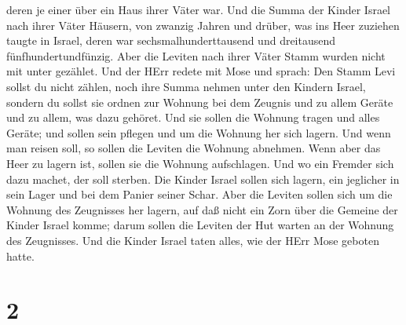 deren je einer über ein Haus ihrer Väter war.  Und die
Summa der Kinder Israel nach ihrer Väter Häusern, von zwanzig Jahren und
drüber, was ins Heer zuziehen taugte in Israel,  deren war
sechsmalhunderttausend und dreitausend fünfhundertundfünzig.
 Aber die Leviten nach ihrer Väter Stamm wurden nicht mit
unter gezählet.  Und der HErr redete mit Mose und sprach:
 Den Stamm Levi sollst du nicht zählen, noch ihre Summa
nehmen unter den Kindern Israel,  sondern du sollst sie
ordnen zur Wohnung bei dem Zeugnis und zu allem Geräte und zu allem, was
dazu gehöret. Und sie sollen die Wohnung tragen und alles Geräte; und
sollen sein pflegen und um die Wohnung her sich lagern. 
Und wenn man reisen soll, so sollen die Leviten die Wohnung abnehmen.
Wenn aber das Heer zu lagern ist, sollen sie die Wohnung aufschlagen.
Und wo ein Fremder sich dazu machet, der soll sterben.  Die
Kinder Israel sollen sich lagern, ein jeglicher in sein Lager und bei
dem Panier seiner Schar.  Aber die Leviten sollen sich um
die Wohnung des Zeugnisses her lagern, auf daß nicht ein Zorn über die
Gemeine der Kinder Israel komme; darum sollen die Leviten der Hut warten
an der Wohnung des Zeugnisses.  Und die Kinder Israel taten
alles, wie der HErr Mose geboten hatte.

\hypertarget{section-1}{%
\section{2}\label{section-1}}

